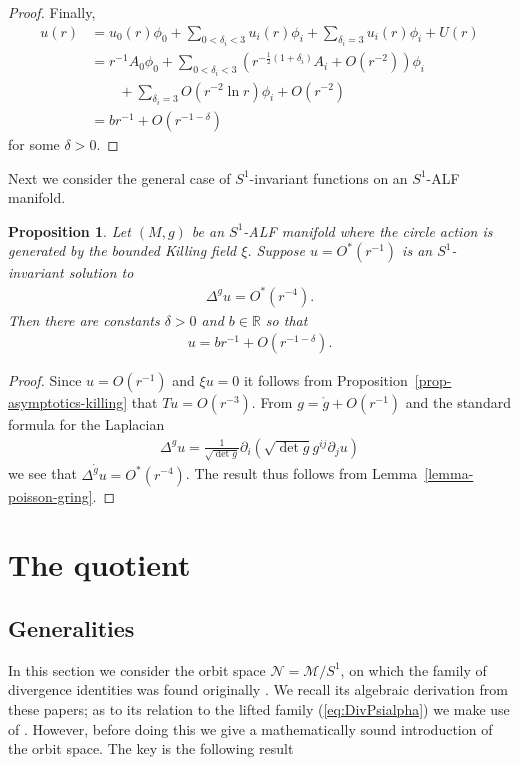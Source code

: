 \documentclass[a4paper,10pt,reqno]{amsart}
\newcommand{\Reals}{\mathbb{R}}
\newcommand{\cM}{\mathcal{M}}
\newcommand{\cN}{\mathcal{N}}
\theoremstyle{plain}
\newtheorem{prop}[thm]{Proposition}
\newcommand{\gring}{\mathring{g}}
\numberwithin{equation}{section}
\begin{document}
\begin{proof}
Finally,
\begin{align}
u(r) &= 
u_0(r)\phi_0 
+ \sum_{0 < \delta_i < 3} u_i(r) \phi_i 
+ \sum_{\delta_i = 3} u_i(r) \phi_i 
+ U(r) \\
&=
r^{-1} A_0 \phi_0
+ \sum_{0 < \delta_i < 3} 
\left( r^{-\frac{1}{2}(1+\delta_i)} A_i + O(r^{-2}) \right)\phi_i \\
&\qquad
+ \sum_{\delta_i = 3} O(r^{-2} \ln r)  \phi_i
+ O(r^{-2})\\
&= b r^{-1} + O(r^{-1-\delta})
\end{align}
for some $\delta > 0$.
\end{proof}

Next we consider the general case of $S^1$-invariant functions on an $S^1$-ALF manifold. 

\begin{prop} \label{prop:poisson-g}
Let $(M,g)$ be an $S^1$-ALF manifold where the circle action is generated by the bounded Killing field $\xi$. Suppose $u = O^*(r^{-1})$ is an $S^1$-invariant solution to
\begin{align}
\Delta^{g}u = O^*(r^{-4}).
\end{align}
Then there are constants $\delta >0$ and $b \in \Reals$ so that 
\begin{align} 
u = br^{-1} + O(r^{-1-\delta}).
\end{align} 
\end{prop}

\begin{proof}
Since $u = O(r^{-1})$ and $\xi u = 0$ it follows from Proposition~\ref{prop-asymptotics-killing} that $Tu = O(r^{-3})$. From $g = \gring + O(r^{-1})$ and the standard formula for the Laplacian
\begin{align}
\Delta^g u 
= \frac{1}{\sqrt{\det g}} \partial_i \left( \sqrt{\det g} g^{ij}  \partial_j u \right)
\end{align}
we see that $\Delta^{\gring}u = O^*(r^{-4})$. The result thus follows from Lemma~\ref{lemma-poisson-gring}.
\end{proof}





\section{The quotient}
\label{sec:quotient}
\subsection{Generalities}
In this section we consider the orbit space $\cN = \cM/ S^1$, on which the family  of divergence identities was found originally 
\cite{MR747036,simon:1995}. We recall its algebraic derivation  from these papers; as to its  relation to the lifted family (\ref{eq:DivPsialpha})  we make use of \cite{MR1701088}. 
However, before doing this we give a mathematically sound introduction of the orbit space.
The key is the following result
\end{document}
